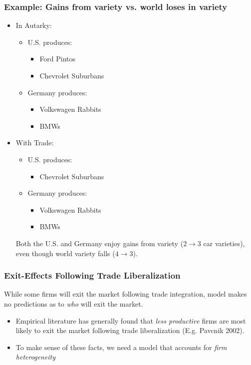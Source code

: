 \documentclass{beamer}
\begin{document}
\begin{frame}
	\frametitle{Example: Gains from variety vs. world loses in variety}
	\footnotesize
\begin{itemize}
	\footnotesize
	\item In Autarky:
		\begin{itemize}
			\footnotesize
			\item U.S. produces: 
				\begin{itemize}
					\footnotesize
					\item Ford Pintos
					\item Chevrolet Suburbans
				\end{itemize}
				
			\item Germany produces:
				\begin{itemize}
					\footnotesize
					\item Volkswagen Rabbits
					\item BMWs
				\end{itemize}
		\end{itemize}
	\item With Trade:
			\begin{itemize}
				\footnotesize
				\item U.S. produces: 
				\begin{itemize}
					\footnotesize
					\item Chevrolet Suburbans
				\end{itemize}
				\item Germany produces:
				\begin{itemize}
					\footnotesize
					\item Volkswagen Rabbits
					\item BMWs
				\end{itemize}
			\end{itemize}

Both the U.S. and Germany enjoy gains from variety ($2 \rightarrow 3 $ car varieties), even though world variety falls ($4\rightarrow 3$).
		

\end{itemize}
\end{frame}



\begin{frame}
	\frametitle{Exit-Effects Following Trade Liberalization}
	While some firms will exit the market following trade integration, model makes no predictions as to \emph{who} will exit the market.
	\begin{itemize}
		\item Empirical literature has generally found that \emph{less productive} firms are most likely to exit the market following trade liberalization (E.g. Pavcnik 2002).
		\item To make sense of these facts, we need a model that accounts for \emph{firm heterogeneity}
	\end{itemize}
\end{frame}
\end{document}
